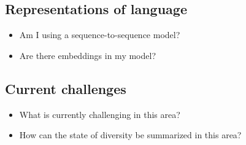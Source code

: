 \documentclass[11pt]{article}
\begin{document}
\subsection{Representations of language}

\begin{itemize}
    \item Am I using a sequence-to-sequence model?
    \item Are there embeddings in my model?
\end{itemize}

\subsection{Current challenges}

\begin{itemize}
    \item What is currently challenging in this area?
    \item How can the state of diversity be summarized in this area?
\end{itemize}
\end{document}
